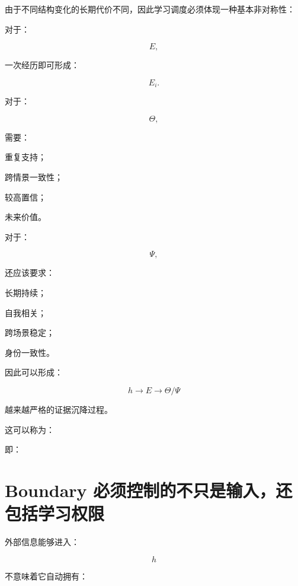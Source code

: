 由于不同结构变化的长期代价不同，因此学习调度必须体现一种基本非对称性：

\begin{statementbox}
\centering
{}
\end{statementbox}

对于：

\[
E,
\]

一次经历即可形成：

\[
E_i.
\]

对于：

\[
\Theta,
\]

需要：

重复支持；

跨情景一致性；

较高置信；

未来价值。

对于：

\[
\Psi,
\]

还应该要求：

长期持续；

自我相关；

跨场景稳定；

身份一致性。

因此可以形成：

\[
\boxed{
h
\rightarrow
E
\rightarrow
\Theta/\Psi
}
\]

越来越严格的证据沉降过程。

这可以称为：

\begin{statementbox}
\centering
{}
\end{statementbox}

即：

\begin{statementbox}
\centering
{}
\end{statementbox}


\section{Boundary 必须控制的不只是输入，还包括学习权限}

外部信息能够进入：

\[
h
\]

不意味着它自动拥有：


